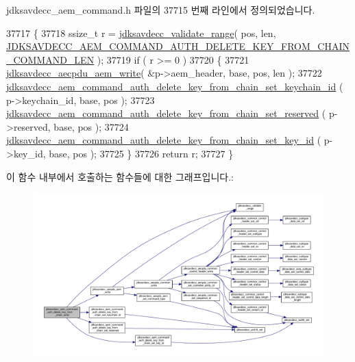 jdksavdecc\+\_\+aem\+\_\+command.\+h 파일의 37715 번째 라인에서 정의되었습니다.


\begin{DoxyCode}
37717 \{
37718     ssize\_t r = \hyperlink{group__util_ga9c02bdfe76c69163647c3196db7a73a1}{jdksavdecc\_validate\_range}( pos, len, 
      \hyperlink{group__command__auth__delete__key__from__chain_ga701f74f6c66335250d7cb6bf5b6ea0fa}{JDKSAVDECC\_AEM\_COMMAND\_AUTH\_DELETE\_KEY\_FROM\_CHAIN\_COMMAND\_LEN}
       );
37719     \textcolor{keywordflow}{if} ( r >= 0 )
37720     \{
37721         \hyperlink{group__aecpdu__aem_gad658e55771cce77cecf7aae91e1dcbc5}{jdksavdecc\_aecpdu\_aem\_write}( &p->aem\_header, base, pos, len );
37722         \hyperlink{group__command__auth__delete__key__from__chain_ga363dacdcc27889331e0861ae0f44d4d0}{jdksavdecc\_aem\_command\_auth\_delete\_key\_from\_chain\_set\_keychain\_id}
      ( p->keychain\_id, base, pos );
37723         \hyperlink{group__command__auth__delete__key__from__chain_gac25781fadb6b56cff3c42fd8d4728aed}{jdksavdecc\_aem\_command\_auth\_delete\_key\_from\_chain\_set\_reserved}
      ( p->reserved, base, pos );
37724         \hyperlink{group__command__auth__delete__key__from__chain_ga246f987b0bd36f564dd66f7570c59709}{jdksavdecc\_aem\_command\_auth\_delete\_key\_from\_chain\_set\_key\_id}
      ( p->key\_id, base, pos );
37725     \}
37726     \textcolor{keywordflow}{return} r;
37727 \}
\end{DoxyCode}


이 함수 내부에서 호출하는 함수들에 대한 그래프입니다.\+:
\nopagebreak
\begin{figure}[H]
\begin{center}
\leavevmode
\includegraphics[width=350pt]{group__command__auth__delete__key__from__chain_ga9d43c1e7add9c5f46614748431f6555e_cgraph}
\end{center}
\end{figure}


